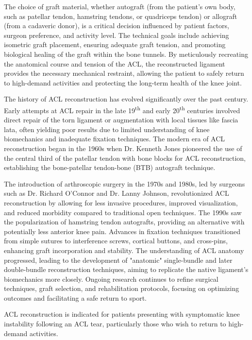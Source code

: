The choice of graft material, whether autograft (from the patient's own body, such as patellar tendon, hamstring tendons, or quadriceps tendon) or allograft (from a cadaveric donor), is a critical decision influenced by patient factors, surgeon preference, and activity level. The technical goals include achieving isometric graft placement, ensuring adequate graft tension, and promoting biological healing of the graft within the bone tunnels. By meticulously recreating the anatomical course and tension of the ACL, the reconstructed ligament provides the necessary mechanical restraint, allowing the patient to safely return to high-demand activities and protecting the long-term health of the knee joint.

The history of ACL reconstruction has evolved significantly over the past century. Early attempts at ACL repair in the late 19\textsuperscript{th} and early 20\textsuperscript{th} centuries involved direct repair of the torn ligament or augmentation with local tissues like fascia lata, often yielding poor results due to limited understanding of knee biomechanics and inadequate fixation techniques. The modern era of ACL reconstruction began in the 1960s when Dr. Kenneth Jones pioneered the use of the central third of the patellar tendon with bone blocks for ACL reconstruction, establishing the bone-patellar tendon-bone (BTB) autograft technique.

The introduction of arthroscopic surgery in the 1970s and 1980s, led by surgeons such as Dr. Richard O'Connor and Dr. Lanny Johnson, revolutionized ACL reconstruction by allowing for less invasive procedures, improved visualization, and reduced morbidity compared to traditional open techniques. The 1990s saw the popularization of hamstring tendon autografts, providing an alternative with potentially less anterior knee pain. Advances in fixation techniques transitioned from simple sutures to interference screws, cortical buttons, and cross-pins, enhancing graft incorporation and stability. The understanding of ACL anatomy progressed, leading to the development of "anatomic" single-bundle and later double-bundle reconstruction techniques, aiming to replicate the native ligament's biomechanics more closely. Ongoing research continues to refine surgical techniques, graft selection, and rehabilitation protocols, focusing on optimizing outcomes and facilitating a safe return to sport.

ACL reconstruction is indicated for patients presenting with symptomatic knee instability following an ACL tear, particularly those who wish to return to high-demand activities.

